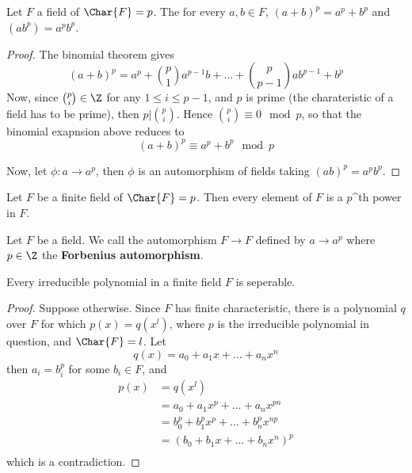 \begin{lemma}\label{1.6.6}
    Let $F$ a field of  $\Char{F}=p$. The for every $a,b \in F$,
    $(a+b)^p=a^p+b^p$ and $(ab^p)=a^pb^p$.
\end{lemma}
\begin{proof}
    The binomial theorem gives
    \begin{equation*}
        (a+b)^p=a^p+{p \choose 1}a^{p-1}b+\dots+{p \choose p-1}ab^{p-1}+b^p
    \end{equation*}
    Now, since ${p \choose i} \in \Z$ for any $1 \leq i \leq p-1$, and $p$ is
    prime (the charateristic of a field has to be prime), then $p|{p \choose
    i}$. Hence ${p \choose i} \equiv 0 \mod{p}$, so that the binomial exapnsion
    above reduces to
    \begin{equation*}
        (a+b)^p \equiv a^p+b^p \mod{p}
    \end{equation*}

    Now, let $\phi:a \xrightarrow{} a^p$, then $\phi$ is an automorphism of
    fields taking  $(ab)^p=a^pb^p$.
\end{proof}
\begin{corollary}
    Let $F$ be a finite field of  $\Char{F}=p$. Then every element of $F$ is a
    $p$^{th} power in $F$.
\end{corollary}

\begin{definition}
    Let $F$ be a field. We call the automorphism  $F \xrightarrow{} F$ defined
    by $a \xrightarrow{} a^p$ where $p \in \Z$ the \textbf{Forbenius automorphism}.
\end{definition}

\begin{lemma}\label{1.6.7}
    Every irreducible polynomial in a finite field $F$ is seperable.
\end{lemma}
\begin{proof}
    Suppose otherwise. Since $F$ has finite characteristic, there is a
    polynomial $q$ over $F$ for which $p(x)=q(x^l)$, where $p$ is the
    irreducible polynomial in question, and  $\Char{F}=l$. Let
    \begin{equation*}
        q(x)=a_0+a_1x+\dots+a_nx^n
    \end{equation*}
    then $a_i=b_i^p$ for some  $b_i \in F$, and
    \begin{align*}
        p(x)    &=  q(x^l)  \\
                &=  a_0+a_1x^p+\dots+a_nx^{pn}  \\
                &=  b_0^p+b_1^px^p+\dots+b_n^px^{np}    \\
                &=  (b_0+b_1x+\dots+b_nx^n)^p   \\
    \end{align*}
    which is a contradiction.
\end{proof}


